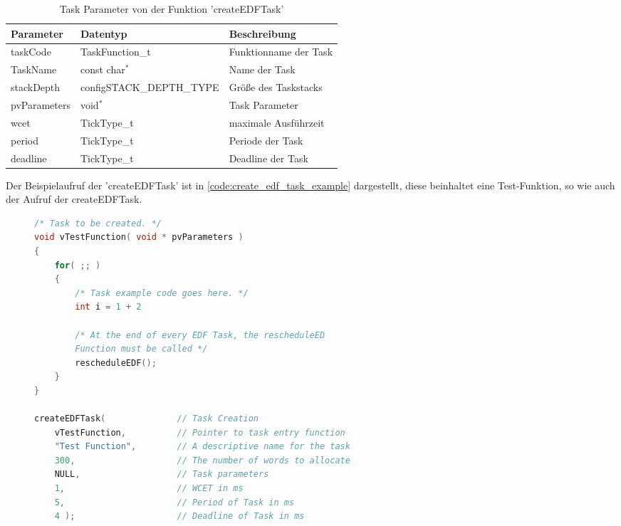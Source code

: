 \documentclass[../EDF Master Thesis.tex]{subfiles}
\begin{document}
    \begin{table}[H]
        \centering
        \begin{tabular}{l|l|l}
            Parameter & Datentyp & Beschreibung \\
            \hline
            taskCode & TaskFunction\_t & Funktionname der Task \\
            TaskName & const char\( ^* \) & Name der Task  \\
            stackDepth & configSTACK\_DEPTH\_TYPE & Größe des Taskstacks \\
            pvParameters & void\( ^* \) & Task Parameter \\
            wcet & TickType\_t & maximale Ausführzeit \\ 
            period & TickType\_t & Periode der Task \\
            deadline & TickType\_t & Deadline der Task \\
        \end{tabular}
        \caption{Task Parameter von der Funktion 'createEDFTask'}
        \label{table:task_parameter_von_der_funktion_createEDFTask}
    \end{table}

    Der Beispielaufruf der 'createEDFTask' ist in \autoref{code:create_edf_task_example} dargestellt, diese beinhaltet eine Test-Funktion, so wie auch der Aufruf der createEDFTask.

\begin{figure}[ht!]
\begin{lstlisting}[language=C, caption=createEDFTask Beispiel, label=code:create_edf_task_example]
/* Task to be created. */
void vTestFunction( void * pvParameters )
{
    for( ;; )
    {
        /* Task example code goes here. */
        int i = 1 + 2

        /* At the end of every EDF Task, the rescheduleED
        Function must be called */
        rescheduleEDF();
    }
}

createEDFTask(              // Task Creation
    vTestFunction,          // Pointer to task entry function
    "Test Function",        // A descriptive name for the task
    300,                    // The number of words to allocate
    NULL,                   // Task parameters 
    1,                      // WCET in ms
    5,                      // Period of Task in ms
    4 );                    // Deadline of Task in ms
\end{lstlisting}
\end{figure}
\end{document}
